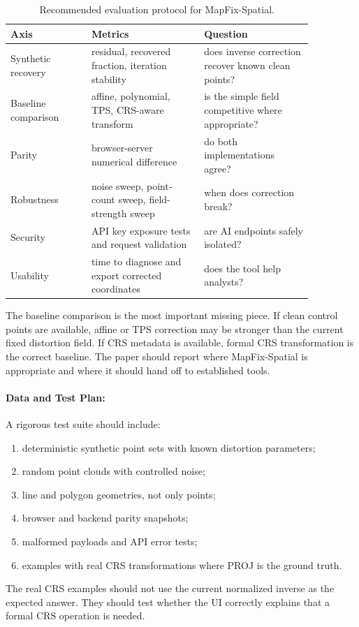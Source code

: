\documentclass{article}
\begin{document}
\begin{table}[t]
\centering
\caption{Recommended evaluation protocol for MapFix-Spatial.}
\label{tab:mapfix_protocol}
\begin{tabular}{@{}p{0.23\linewidth}p{0.32\linewidth}p{0.31\linewidth}@{}}
\toprule
\textbf{Axis} & \textbf{Metrics} & \textbf{Question}\\
\midrule
Synthetic recovery & residual, recovered fraction, iteration stability & does inverse correction recover known clean points?\\
Baseline comparison & affine, polynomial, TPS, CRS-aware transform & is the simple field competitive where appropriate?\\
Parity & browser-server numerical difference & do both implementations agree?\\
Robustness & noise sweep, point-count sweep, field-strength sweep & when does correction break?\\
Security & API key exposure tests and request validation & are AI endpoints safely isolated?\\
Usability & time to diagnose and export corrected coordinates & does the tool help analysts?\\
\bottomrule
\end{tabular}
\end{table}

The baseline comparison is the most important missing piece. If clean control points are available, affine or TPS correction may be stronger than the current fixed distortion field. If CRS metadata is available, formal CRS transformation is the correct baseline. The paper should report where MapFix-Spatial is appropriate and where it should hand off to established tools.

\paragraph{Data and Test Plan:}

A rigorous test suite should include:
\begin{enumerate}
  \item deterministic synthetic point sets with known distortion parameters;
  \item random point clouds with controlled noise;
  \item line and polygon geometries, not only points;
  \item browser and backend parity snapshots;
  \item malformed payloads and API error tests;
  \item examples with real CRS transformations where PROJ is the ground truth.
\end{enumerate}
The real CRS examples should not use the current normalized inverse as the expected answer. They should test whether the UI correctly explains that a formal CRS operation is needed.
\end{document}
